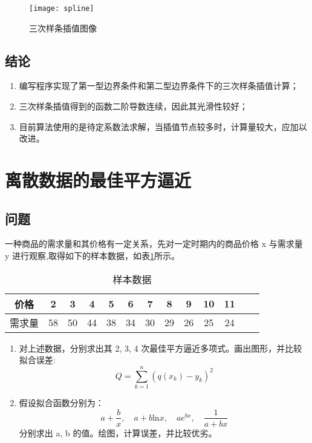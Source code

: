 \begin{figure}[ht]
    \centering
      \texttt{[image: spline]}
      \caption{三次样条插值图像}
      \label{fig:spline}
\end{figure}


\subsection{结论}

\begin{enumerate}[(1)]
    \item 编写程序实现了第一型边界条件和第二型边界条件下的三次样条插值计算；
    \item 三次样条插值得到的函数二阶导数连续，因此其光滑性较好；
    \item 目前算法使用的是待定系数法求解，当插值节点较多时，计算量较大，应加以改进。
\end{enumerate}

\clearpage

\section{离散数据的最佳平方逼近}

\subsection{问题}

一种商品的需求量和其价格有一定关系，先对一定时期内的商品价格 x 与需求量 y 进行观察,取得如下的样本数据，如表\ref{tab:sample_data}所示。

\begin{table}[ht]\centering
    \caption{样本数据}
    \label{tab:sample_data}
    \begin{tabular}{c|cccccccccccc}
        价格 & 2 & 3 & 4 & 5 & 6 & 7 & 8 & 9 & 10 & 11 \\
        \hline
        需求量 & 58 & 50 & 44 & 38 & 34 & 30 & 29 & 26 & 25 & 24
    \end{tabular}
\end{table}

\begin{enumerate}[(1)]
    \item 对上述数据，分别求出其 2, 3, 4 次最佳平方逼近多项式。画出图形，并比较拟合误差:
    \begin{equation}
        Q = \sum\limits_{k=1}^{n}(q(x_k) - y_k)^2
    \end{equation}
    \item 假设拟合函数分别为：
    \begin{equation}
        a+\frac{b}{x},\quad a+b\mathrm{ln}x, \quad ae^{bx},\quad \frac{1}{a+bx}
    \end{equation}
    分别求出 a, b 的值。绘图，计算误差，并比较优劣。
\end{enumerate}

